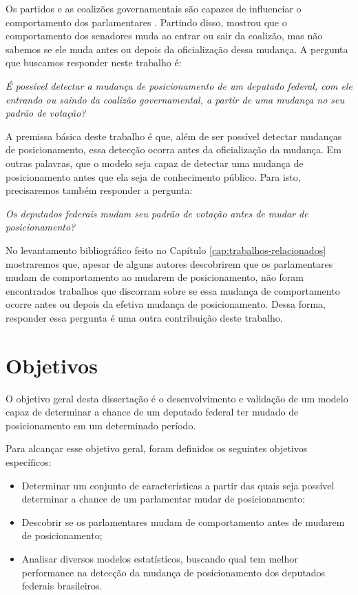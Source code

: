 Os partidos e as coalizões governamentais são capazes de influenciar o
comportamento dos parlamentares \cite{Figueiredo2001,Santos2003}. Partindo
disso,  mostrou que o comportamento dos senadores muda ao
entrar ou sair da coalizão, mas não sabemos se ele muda antes ou depois da
oficialização dessa mudança. A pergunta que buscamos responder neste trabalho
é:

\emph{É possível detectar a mudança de posicionamento de um deputado federal,
com ele entrando ou saindo da coalizão governamental, a partir de uma mudança
no seu padrão de votação?}

A premissa básica deste trabalho é que, além de ser possível detectar mudanças
de posicionamento, essa detecção ocorra antes da oficialização da mudança. Em
outras palavras, que o modelo seja capaz de detectar uma mudança de
posicionamento antes que ela seja de conhecimento público. Para isto,
precisaremos também responder a pergunta:

\emph{Os deputados federais mudam seu padrão de votação antes de mudar de
posicionamento?}

No levantamento bibliográfico feito no Capítulo
\ref{cap:trabalhos-relacionados} mostraremos que, apesar de alguns autores
descobrirem que os parlamentares mudam de comportamento ao mudarem de
posicionamento, não foram encontrados trabalhos que discorram sobre se essa
mudança de comportamento ocorre antes ou depois da efetiva mudança de
posicionamento. Dessa forma, responder essa pergunta é uma outra contribuição
deste trabalho.

\section{Objetivos}

O objetivo geral desta dissertação é o desenvolvimento e validação de um modelo
capaz de determinar a chance de um deputado federal ter mudado de
posicionamento em um determinado período.

Para alcançar esse objetivo geral, foram definidos os seguintes objetivos
específicos:

\begin{itemize}
  \item Determinar um conjunto de características a partir das quais seja
    possível determinar a chance de um parlamentar mudar de posicionamento;
  \item Descobrir se os parlamentares mudam de comportamento antes de mudarem
    de posicionamento;
  \item Analisar diversos modelos estatísticos, buscando qual tem melhor
    performance na detecção da mudança de posicionamento dos deputados
    federais brasileiros.
\end{itemize}

